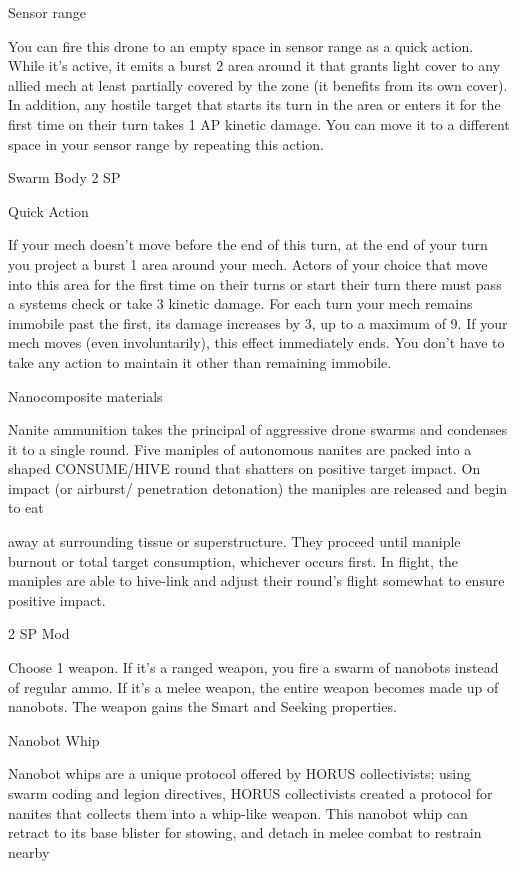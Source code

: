 Sensor range
 
You can fire this drone to an empty space in sensor range as a quick action. While it’s active, it  
emits a burst 2 area around it that grants light cover to any allied mech at least partially covered  
by the zone (it benefits from its own cover). In addition, any hostile target that starts its turn in the  
area or enters it for the first time on their turn takes 1 AP kinetic damage. You can move it to a  
different space in your sensor range by repeating this action.
 

Swarm Body  
2 SP
 
Quick Action
 

                                                                                                                     


If your mech doesn’t move before the end of this turn, at the end of your turn you project a burst  
1 area around your mech. Actors of your choice that move into this area for the first time on their  
turns or start their turn there must pass a systems check or take 3 kinetic damage. For each turn  
your mech remains immobile past the first, its damage increases by 3, up to a maximum of 9. If  
your mech moves (even involuntarily), this effect immediately ends. You don’t have to take any  
action to maintain it other than remaining immobile.
 

Nanocomposite materials  

Nanite ammunition takes the principal of aggressive drone swarms and condenses it to a single round. Five  
maniples of autonomous nanites are packed into a shaped CONSUME/HIVE round that shatters on positive  
target impact. On impact (or airburst/ penetration detonation) the maniples are released and begin to eat  

away at surrounding tissue or superstructure. They proceed until maniple burnout or total target  
consumption, whichever occurs first. In flight, the maniples are able to hive-link and adjust their round’s  
flight somewhat to ensure positive impact.    

2 SP  
Mod  

Choose 1 weapon. If it’s a ranged weapon, you fire a swarm of nanobots instead of regular  
ammo. If it’s a melee weapon, the entire weapon becomes made up of nanobots. The weapon  
gains the Smart and Seeking properties.
 

Nanobot Whip  

Nanobot whips are a unique protocol offered by HORUS collectivists; using swarm coding and legion  
directives, HORUS collectivists created a protocol for nanites that collects them into a whip-like weapon.  
This nanobot whip can retract to its base blister for stowing, and detach in melee combat to restrain nearby  

